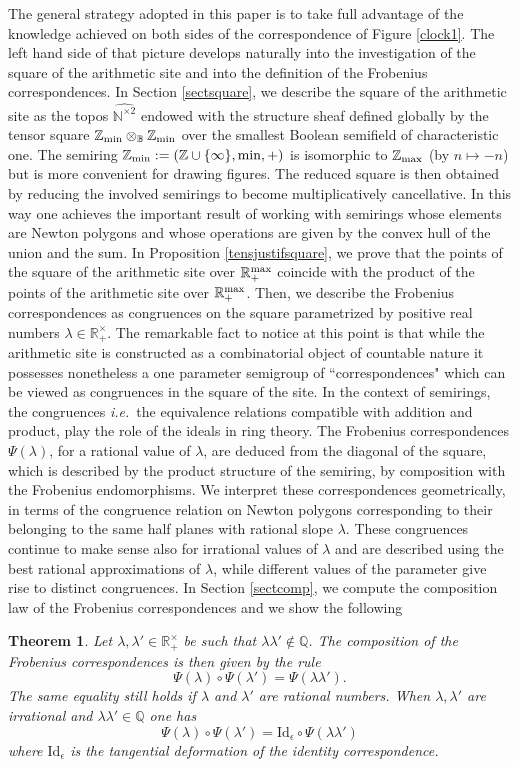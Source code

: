 \documentclass[noams,lp]{compositio}
\newtheorem{thm}{Theorem}[section] %
\def\id{{\rm id}}
\def\B{{\mathbb B}}
\def\N{{\mathbb N}}
\def\Q{{\mathbb Q}}
\def\R{{\mathbb R}}
\def\Z{{\mathbb Z}}
\newcommand{\ie}{{\it i.e.\/}\ }
\def\zmin{\Z_{\rm min}}
\def\id{{\mbox{Id}}}
\def\zmax{{\Z_{\rm max}}}
\def\rmax{\R_+^{\rm max}}
\def\nbo{{\zmin\otimes_\B \zmin}}
\def\wntb{{\widehat{\N^{\times 2}}}}
\begin{document}
The general strategy adopted in this paper is to take full advantage of the knowledge achieved on both sides of the correspondence of Figure \ref{clock1}. The left hand side of that picture develops naturally into the investigation of the square of the arithmetic site and into the definition of the Frobenius correspondences. 
 In Section  \ref{sectsquare}, we describe the square of the arithmetic site as the topos $\wntb$ endowed with the structure sheaf defined globally by the tensor square $\nbo$ over the  smallest Boolean semifield of characteristic one. The semiring $\zmin:= (\Z\cup\{\infty\},\text{min},+)$ is isomorphic to $\zmax$ (by $n\mapsto -n$) but is more convenient for drawing figures. The reduced square is then obtained by reducing the involved semirings to become multiplicatively cancellative. In this way one achieves the important result of working with semirings whose elements are Newton polygons and whose operations are given by the convex hull of the union and the sum. In Proposition \ref{tensjustifsquare}, we prove that the points of the  square of the arithmetic site over $\rmax$ coincide with the product of the points of the  arithmetic site over $\rmax$. Then, we describe the Frobenius correspondences  as congruences on the square parametrized by positive real numbers $\lambda\in \R_+^\times$. The remarkable fact to notice at this point is that while the arithmetic site is constructed as a combinatorial object of countable nature it  possesses nonetheless a one parameter semigroup of ``correspondences" which can be viewed as congruences in the square of the site. In the context of semirings, the congruences \ie the equivalence relations compatible with addition and product, play the role of the ideals in ring theory. The Frobenius correspondences $\Psi(\lambda)$, for a rational value of $\lambda$, are deduced from the diagonal of the square, which is described by the product structure of the semiring, by  composition with the Frobenius endomorphisms. We interpret these correspondences geometrically, in terms of the congruence relation on Newton polygons corresponding to their belonging to the same half planes with rational slope $\lambda$. These congruences continue to make sense also for irrational values of $\lambda$ and are described using the best rational approximations of $\lambda$, while different values  of the parameter give rise to distinct congruences. In Section \ref{sectcomp}, we compute the composition law of the Frobenius correspondences  and we show the following
\begin{thm}\label{thmcomp0} Let $\lambda, \lambda' \in \R_+^\times$ be such that $\lambda\lambda'\notin \Q$. The composition of the Frobenius correspondences is then given by the rule
$$
\Psi(\lambda)\circ \Psi(\lambda')=\Psi(\lambda\lambda').
$$
The same equality still holds if $\lambda$ and $\lambda'$ are rational numbers. When  $\lambda, \lambda'$ are irrational and $\lambda\lambda'\in \Q$ one has
$$
\Psi(\lambda)\circ \Psi(\lambda')=\id_\epsilon\circ \Psi(\lambda\lambda')
$$
where $\id_\epsilon$ is the tangential deformation of the identity correspondence.
\end{thm}
\end{document}
